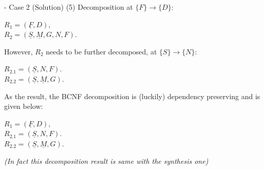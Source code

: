 \begin{frame}[fragile]{ - Case 2 (Solution)}
	(5) Decomposition at $\{F\} \rightarrow \{D\}$:\\\vspace{5pt}
	
	$R_1 = (\underline{F}, D),$\\
	$R_2 = (\underline{S}, \underline{M}, G, N, F).$\\\vspace{5pt}
	
	However, $R_2$ needs to be further decomposed, at $\{S\} \rightarrow \{N\}$:\\\vspace{5pt}
	
	$R_{2.1} = (\underline{S}, N, F).$\\
	$R_{2.2} = (\underline{S}, \underline{M}, G).$\\\vspace{5pt}
	
	As the result, the BCNF decomposition is (luckily) dependency preserving and is given below:\\\vspace{5pt}
	
	$R_1 = (\underline{F}, D),$\\
	$R_{2.1} = (\underline{S}, N, F).$\\
	$R_{2.2} = (\underline{S}, \underline{M}, G).$\\\vspace{5pt}
	
	\textit{(In fact this decomposition result is same with the synthesis one)}
\end{frame}

